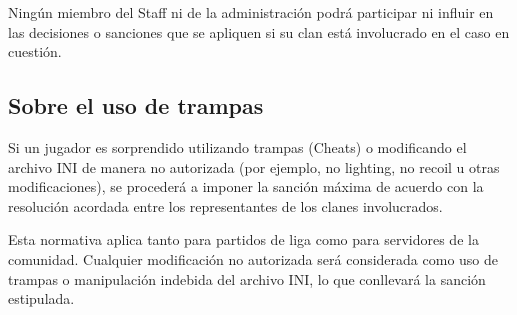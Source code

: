 \documentclass[a4paper, 11pt]{article}
\begin{document}
    Ningún miembro del Staff ni de la administración podrá participar ni influir en las decisiones o sanciones que se apliquen si su clan está involucrado en el caso en cuestión.

    \subsection{Sobre el uso de trampas}
    Si un jugador es sorprendido utilizando trampas (Cheats) o modificando el archivo INI de manera no autorizada (por ejemplo, no lighting, no recoil u otras modificaciones), se procederá a imponer la sanción máxima de acuerdo con la resolución acordada entre los representantes de los clanes involucrados.

    Esta normativa aplica tanto para partidos de liga como para servidores de la comunidad. Cualquier modificación no autorizada será considerada como uso de trampas o manipulación indebida del archivo INI, lo que conllevará la sanción estipulada.
\end{document}
